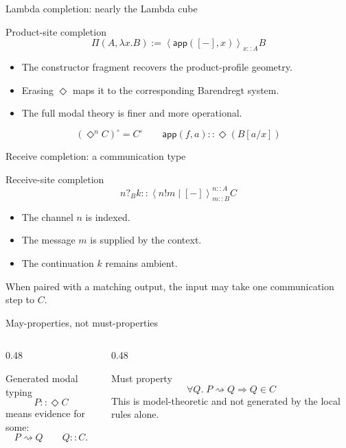 \documentclass[aspectratio=169,11pt]{beamer}
\newcommand{\rw}{\rightsquigarrow}
\newcommand{\ty}{\mathrel{::}}
\newcommand{\dep}{\mathsf{\Pi}}
\newcommand{\app}{\mathsf{app}}
\newcommand{\Dia}{\Diamond}
\newcommand{\hole}{[-]}
\newcommand{\Mod}[4]{\left\langle #1\right\rangle^{#2}_{#3} #4}
\begin{document}
\begin{frame}{Lambda completion: nearly the Lambda cube}
\begin{block}{Product-site completion}
\[
  \dep(A,\lambda x.B) := \Mod{\app(\hole,x)}{}{x\ty A}{B}
\]
\end{block}

\begin{itemize}
  \item The constructor fragment recovers the product-profile geometry.
  \item Erasing \(\Dia\) maps it to the corresponding Barendregt system.
  \item The full modal theory is finer and more operational.
\end{itemize}

\vspace{0.5em}
\[
  (\Dia^n C)^\circ=C^\circ
  \qquad
  \app(f,a)\ty\Dia(B[a/x])
\]
\end{frame}

\begin{frame}{Receive completion: a communication type}
\begin{block}{Receive-site completion}
\[
  n?_B k
  \ty
  \Mod{n!m\mid\hole}{n\ty A}{m\ty B}{C}
\]
\end{block}

\begin{itemize}
  \item The channel \(n\) is indexed.
  \item The message \(m\) is supplied by the context.
  \item The continuation \(k\) remains ambient.
\end{itemize}

\vspace{0.5em}
\begin{center}
When paired with a matching output, the input may take one communication step to \(C\).
\end{center}
\end{frame}

\begin{frame}{May-properties, not must-properties}
\begin{columns}[T]
\begin{column}{0.48\textwidth}
\begin{block}{Generated modal typing}
\[
  P\ty\Dia C
\]
means evidence for some:
\[
  P\rw Q
  \qquad
  Q\ty C.
\]
\end{block}

\end{column}
\begin{column}{0.48\textwidth}
\begin{block}{Must property}
\[
  \forall Q.\; P\rw Q\Rightarrow Q\in C
\]
This is model-theoretic and not generated by the local rules alone.
\end{block}
\end{column}
\end{columns}
\end{frame}
\end{document}
